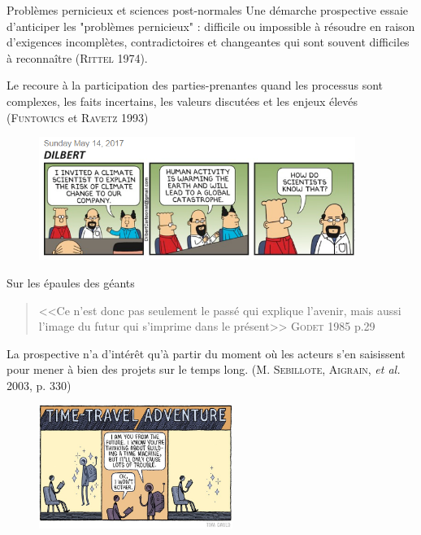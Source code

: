 \documentclass[newPxFont]{beamer}
\begin{document}
\begin{frame}[c]{Problèmes pernicieux et sciences post-normales}
  \vspace{-2em}
  Une démarche prospective essaie d'anticiper les "problèmes pernicieux" :  difficile ou impossible à résoudre en raison d'exigences incomplètes, contradictoires et changeantes qui sont souvent difficiles à reconnaître (\textsc{Rittel} 1974).

  Le recoure à la participation des parties-prenantes quand les processus sont complexes, les faits incertains, les valeurs discutées et les enjeux élevés (\textsc{Funtowics} et \textsc{Ravetz} 1993)

  \begin{figure}
   \includegraphics[height=4cm]{img/a_dilbert-climate-science.png}
  \end{figure}
\end{frame}

\begin{frame}[c]{Sur les épaules des géants}
  \vspace{-2em}
  \begin{quote}
    <<Ce n'est donc pas seulement le passé qui explique l'avenir, mais aussi l'image du futur qui s'imprime dans le présent>>
    \hspace*{\fill}\textsc{Godet} 1985 p.29
  \end{quote}
  La prospective n'a d'intérêt qu'à partir du moment où les acteurs s'en saisissent pour mener à bien des projets sur le temps long. (\textsc{M. Sebillote, Aigrain}, \textit{et al.} 2003, p. 330)
  \begin{figure}
   \includegraphics[height=4cm]{img/a_thom_gauld_futureMachine.jpg}
  \end{figure}
\end{frame}
\end{document}
